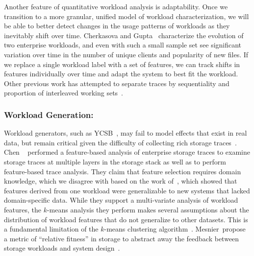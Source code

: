 Another feature of quantitative workload analysis is adaptability.  Once we
transition to a more granular, unified model of workload characterization, we
will be able to better detect changes in the usage patterns of workloads as they
inevitably shift over time.  Cherkasova and Gupta~\cite{char_local} characterize the
evolution of two enterprise workloads, and even with such a small sample set see
significant variation over time in the number of unique clients and popularity
of new files.  If we replace a single workload label with a set of features, we
can track shifts in features individually over time and adapt the system to best
fit the workload.  Other previous work has attempted to separate traces by sequentiality and
proportion of interleaved working sets~\cite{seo_char}.  



\subsubsection*{Workload Generation: }
Workload generators, such as YCSB~\cite{ycsb}, may fail to model effects that
exist in real
data, but remain critical given the difficulty of collecting rich storage traces~\cite{memcached-sigmetrics,ganger1995generating,kurmas2003synthesizing,tarasov2012extracting}.  
Chen \etal~\cite{chen-kmeans} performed a feature-based analysis of enterprise
storage traces to examine storage traces at multiple layers in the storage
stack as well as to perform feature-based trace analysis.  They claim that
feature selection requires domain knowledge, which we disagree with based on
the work of~\cite{powers}, which showed that features derived from one workload
were generalizable to new systems that lacked domain-specific data.
While they support a multi-variate analysis of workload features, the $k$-means
analysis they perform makes several assumptions about the distribution of
workload features that do not generalize to other datasets. %
This is a fundamental limitation of the $k$-means clustering 
algorithm~\cite{robinson}.
Mesnier~\etal propose a metric of ``relative fitness'' in storage to abstract
away the feedback between storage workloads and system
design~\cite{mesnier05,mesnier07}.  


